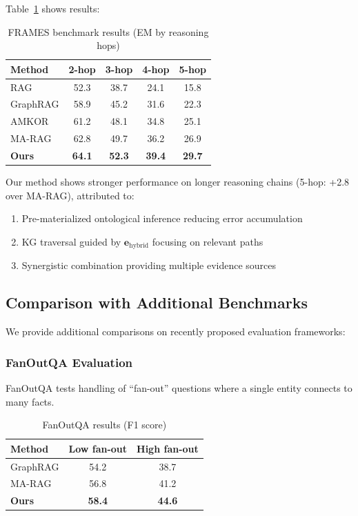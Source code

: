\documentclass[10pt,twocolumn]{article}
\begin{document}
Table~\ref{tab:frames} shows results:

\begin{table}[t]
\centering
\caption{FRAMES benchmark results (EM by reasoning hops)}
\label{tab:frames}
\small
\begin{tabular}{@{}lcccc@{}}
\toprule
\textbf{Method} & \textbf{2-hop} & \textbf{3-hop} & \textbf{4-hop} & \textbf{5-hop} \\
\midrule
RAG & 52.3 & 38.7 & 24.1 & 15.8 \\
GraphRAG & 58.9 & 45.2 & 31.6 & 22.3 \\
AMKOR & 61.2 & 48.1 & 34.8 & 25.1 \\
MA-RAG & 62.8 & 49.7 & 36.2 & 26.9 \\
\midrule
\textbf{Ours} & \textbf{64.1} & \textbf{52.3} & \textbf{39.4} & \textbf{29.7} \\
\bottomrule
\end{tabular}
\end{table}

Our method shows stronger performance on longer reasoning chains (5-hop: +2.8 over MA-RAG), attributed to:
\begin{enumerate}
    \item Pre-materialized ontological inference reducing error accumulation
    \item KG traversal guided by $\mathbf{e}_{\text{hybrid}}$ focusing on relevant paths
    \item Synergistic combination providing multiple evidence sources
\end{enumerate}


\subsection{Comparison with Additional Benchmarks}
\label{sec:additional_benchmarks}

We provide additional comparisons on recently proposed evaluation frameworks:

\subsubsection{FanOutQA Evaluation}

FanOutQA \cite{zhu2024fanoutqa} tests handling of ``fan-out'' questions where a single entity connects to many facts. 

\begin{table}[h]
\centering
\caption{FanOutQA results (F1 score)}
\label{tab:fanoutqa}
\small
\begin{tabular}{@{}lcc@{}}
\toprule
\textbf{Method} & \textbf{Low fan-out} & \textbf{High fan-out} \\
\midrule
GraphRAG & 54.2 & 38.7 \\
MA-RAG & 56.8 & 41.2 \\
\textbf{Ours} & \textbf{58.4} & \textbf{44.6} \\
\bottomrule
\end{tabular}
\end{table}
\end{document}
